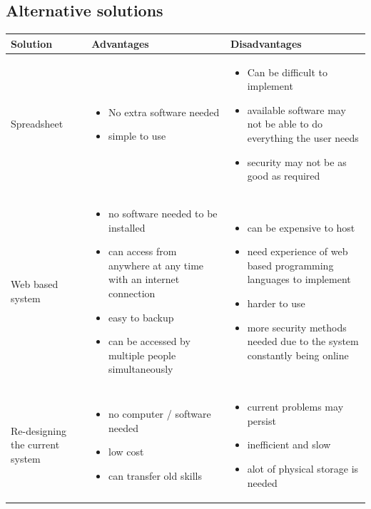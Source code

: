 \subsection{Alternative solutions}
\begin{center}
\begin{tabular}{|l|p{4.5cm}|p{4.5cm}|}
	\hline
	\textbf{Solution} & \textbf{Advantages} & \textbf{Disadvantages} \\ \hline
	Spreadsheet & \begin{itemize} \item No extra software needed \item simple to use \end{itemize} & \begin{itemize} \item Can be difficult to implement \item available software may not be able to do everything the user needs \item security may not be as good as required \end{itemize} \\ \hline
	Web based system & \begin{itemize} \item no software needed to be installed \item can access from anywhere at any time with an internet connection \item easy to backup \item can be accessed by multiple people simultaneously \end{itemize} & \begin{itemize} \item can be expensive to host \item need experience of web based programming languages to implement \item harder to use \item more security methods needed due to the system constantly being online \end{itemize} \\ \hline
	Re-designing the current system & \begin{itemize} \item no computer / software needed \item low cost \item can transfer old skills \end{itemize} & \begin{itemize} \item current problems may persist \item inefficient and slow \item alot of physical storage is needed \end{itemize} \\ \hline

\end{tabular}
\end{center}
